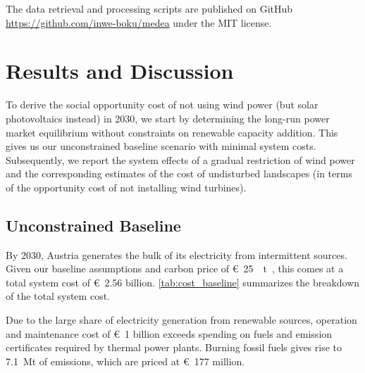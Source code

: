 \documentclass[review, 3p, times, 12pt, authoryear]{elsarticle}
\begin{document}
    The data retrieval and processing scripts are published on GitHub \url{https://github.com/inwe-boku/medea} under the MIT license.



    \section{Results and Discussion} \label{sec:results-discussion}
    To derive the social opportunity cost of not using wind power (but solar photovoltaics instead) in 2030, we start by determining the long-run power market equilibrium without constraints on renewable capacity addition.
    This gives us our unconstrained baseline scenario with minimal system costs.
    Subsequently, we report the system effects of a gradual restriction of wind power and the corresponding estimates of the cost of undisturbed landscapes (in terms of the opportunity cost of not installing wind turbines).

    \subsection{Unconstrained Baseline} \label{subsec:baseline}
    By 2030, Austria generates the bulk of its electricity from intermittent sources.
    Given our baseline assumptions and carbon price of \SI[per-mode=symbol,sticky-per, bracket-unit-denominator=false]{25}[\euro]{\per\tonne\coo}, this comes at a total system cost of  \SI{2.56}[\euro]{} billion.
    \autoref{tab:cost_baseline} summarizes the breakdown of the total system cost.

    Due to the large share of electricity generation from renewable sources, operation and maintenance cost of \SI{1}[\euro]{} billion exceeds spending on fuels and emission certificates required by thermal power plants.
    Burning fossil fuels gives rise to \SI{7.1}{\mega\tonne} of  emissions, which are priced at \SI{177}[\euro]{} million.
\end{document}
